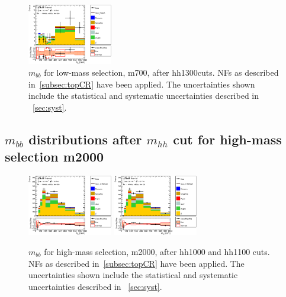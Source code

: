 \begin{figure}[!h]
\begin{center}
\includegraphics*[width=0.33\textwidth] {figures/ControlPlots/reOpt700_bbMass_allMhh/C_reOpt700_mww_bbpt210_wwpt250_hh1300c_bbMass_regionA_met25d020}
\caption[$m_{bb}$ for low-mass selection, m700, after hh1300 cuts.]{$m_{bb}$ for low-mass selection, m700, after hh1300cuts. \ttbar NFs as described in~\ref{subsec:topCR} have been applied. The uncertainties shown include the statistical and systematic uncertainties described in ~\ref{sec:syst}.}
\end{center}
\end{figure}

\subsection{$m_{bb}$ distributions after $m_{hh}$ cut for high-mass selection m2000} 

\begin{figure}[!h]
\begin{center}
\includegraphics*[width=0.33\textwidth] {figures/ControlPlots/reOpt2000_bbMass_allMhh/C_reOpt2000_bbpt350_wwpt250_drww15_hh1000_bbMass_regionA_met25d020}
\includegraphics*[width=0.33\textwidth] {figures/ControlPlots/reOpt2000_bbMass_allMhh/C_reOpt2000_bbpt350_wwpt250_drww15_hh1100_bbMass_regionA_met25d020}
\caption[$m_{bb}$ for low-mass selection, m2000, after hh1000 and hh1100 cuts.]{$m_{bb}$ for high-mass selection, m2000, after hh1000 and hh1100 cuts. \ttbar NFs as described in~\ref{subsec:topCR} have been applied. The uncertainties shown include the statistical and systematic uncertainties described in ~\ref{sec:syst}.}
\end{center}
\end{figure}


